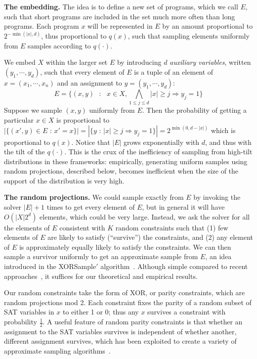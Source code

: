 \documentclass{article}
\begin{document}
\textbf{The embedding.} The idea is to define a new set of programs, which we call $E$, such that short programs are included in the set much more often than long programs.
Each program $x$ will be represented in $E$ by an amount proportional to $2^{-\min (\lvert x \rvert ,d)}$, thus proportional to $q(x)$,
such that sampling elements uniformly from $E$  samples according to $q(\cdot )$.

We embed $X$ within the larger set $E$ by introducing $d$ \emph{auxiliary variables}, written $(y_1,\cdots, y_d)$,
such that every element of $E$ is a tuple of an element of $x = (x_1,\cdots , x_n )$ and an assignment to $y = (y_1,\cdots, y_d)$:
  \begin{equation}
    E = \{(x,y) \text{ }:\text{ } x\in X,  \bigwedge_{1\leq j \leq d} \lvert x \rvert \geq j\Rightarrow y_j=1 \}
  \end{equation}
  Suppose we sample $(x,y)$ uniformly from $E$.
  Then the probability of getting a particular $x\in X$ is proportional to
  $|\{(x',y)\in E \text{ : } x' = x\}| = |\{y\text{ : } \lvert x \rvert \geq j\Rightarrow y_j=1\}|=2^{\min (0,d-\lvert x \rvert )}$ 
  which is proportional to $q(x)$. Notice that $|E|$ grows exponentially with $d$, and thus with the tilt of the $q(\cdot )$. This is the crux of the inefficiency of sampling from high-tilt distributions in these frameworks:
  empirically, generating uniform samples using random projections, described below, becomes inefficient when the size of the support of the distribution is very high.

  \textbf{The random projections.} We  could sample exactly from $E$  by invoking the solver $|E|+1$ times to get every element of $E$,
  but in general it will have $O(|X|2^d)$ elements, which could be very large.
  Instead, we ask the solver for all the elements of $E$ consistent with $K$ random constraints
  such that (1) few elements of $E$ are likely to satisfy (``survive'') the constraints,
  and (2) any element of $E$ is approximately equally likely to satisfy the constraints.
  We can then sample a survivor uniformly to get an approximate sample from $E$, an idea introduced in the XORSample$'$ algorithm~\cite{gomes2006near}.
  Although simple compared to recent approaches~\cite{chakraborty2014balancing,ermon2014low,achlioptas2015stochastic}, it suffices for our theoretical and empirical results.

  Our random constraints take the form of XOR, or parity constraints, which are random projections mod 2.
  Each constraint fixes the parity of a random subset of SAT variables in $x$ to either 1 or 0;
  thus any $x$ survives a constraint with probability $\frac{1}{2}$.
  A useful feature of random parity constraints is that whether an assignment to the SAT variables survives is independent of whether another, different assignment survives, which has been exploited to create a variety of approximate sampling algorithms~\cite{gomes2006near,valiant1985np,chakraborty2014balancing,gomes2006model}.
  
\end{document}
